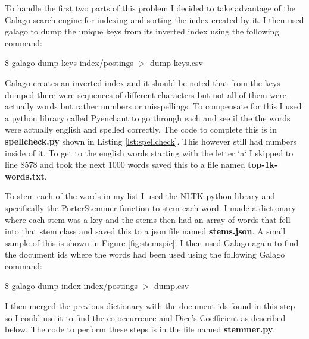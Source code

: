 \documentclass[letterpaper,11pt]{article}
\newcommand*{\srcPath}{../src}%
\begin{document}
To handle the first two parts of this problem I decided to take advantage of the Galago search engine for indexing and sorting the index created by it.
I then used galago to dump the unique keys from its inverted index using the following command: 

\begin{center}
{\$ galago dump-keys index/postings $>$ dump-keys.csv }
\end{center}

Galago creates an inverted index and it should be noted that from the keys dumped there were sequences of different characters but not all of them were actually words but rather numbers or misspellings. 
To compensate for this I used a python library called Pyenchant \cite{pyenchant} to go through each and see if the the words were actually english and spelled correctly.
The code to complete this is in \textbf{spellcheck.py} shown in Listing \ref{lst:spellcheck}. 
This however still had numbers inside of it. 
To get to the english words starting with the letter `a` I skipped to line 8578 and took the next 1000 words saved this to a file named \textbf{top-1k-words.txt}.
 
 

To stem each of the words in my list I used the NLTK python library \cite{nltk} and specifically the PorterStemmer function to stem each word.
I made a dictionary where each stem was a key and the stems then had an array of words that fell into that stem class and saved this to a json file named \textbf{stems.json}.
A small sample of this is shown in Figure \ref{fig:stemspic}.
I then used Galago again to find the document ids where the words had been used using the following Galago command:

\begin{center}
{\$ galago dump-index index/postings $>$ dump.csv }
\end{center}

I then merged the previous dictionary with the document ids found in this step so I could use it to find the co-occurrence and Dice's Coefficient as described below. 
The code to perform these steps is in the file named \textbf{stemmer.py}.
\end{document}
